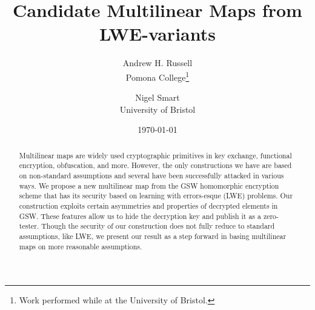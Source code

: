 \documentclass[11pt]{article}
\title{Candidate Multilinear Maps from LWE-variants}
\author{Andrew H. Russell \\ Pomona College\thanks{Work performed while at the University of Bristol.} \and Nigel Smart  \\ University of Bristol}
\date{\today}
\begin{document}
\maketitle
\begin{abstract}
Multilinear maps are widely used cryptographic primitives in key exchange, functional encryption, obfuscation, and more.  However, the only constructions we have are based on non-standard assumptions and several have been successfully attacked in various ways.  We propose a new multilinear map from the GSW homomorphic encryption scheme that has its security based on learning with errors-esque (LWE) problems.  Our construction exploits certain asymmetries and properties of decrypted elements in GSW.  These features allow us to hide the decryption key and publish it as a zero-tester. Though the security of our construction does not fully reduce to standard assumptions, like LWE, we present our result as a step forward in basing multilinear maps on more reasonable assumptions.
\end{abstract}







\newpage




\end{document}
